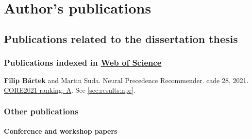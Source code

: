 \chapter{Author's publications}



\newcommand{\auth}\textbf
\newcommand{\core}[3]{\href{https://portal.core.edu.au/conf-ranks/#3/}{CORE#1 ranking: #2}}


\section{Publications related to the dissertation thesis}

\subsection{Publications indexed in \href{https://www.webofscience.com/}{Web of Science}}

\auth{Filip Bártek} and Martin Suda.
Neural Precedence Recommender.
\Gls{cade} 28, 2021.
\cite{DBLP:conf/cade/Bartek021}
\\
\core{2021}{A}{918}. See \cref{sec:results:npr}.

\subsection{Other publications}

\subsubsection{Conference and workshop papers}

